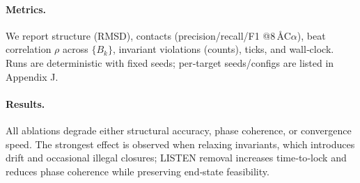\documentclass[12pt,a4paper]{article}
\begin{document}
\paragraph{Metrics.}
We report structure (RMSD), contacts (precision/recall/F1 @8\,\AA C$\alpha$), beat correlation $\rho$ across $\{B_k\}$, invariant violations (counts), ticks, and wall‑clock. Runs are deterministic with fixed seeds; per‑target seeds/configs are listed in Appendix J.
\paragraph{Results.}
All ablations degrade either structural accuracy, phase coherence, or convergence speed. The strongest effect is observed when relaxing invariants, which introduces drift and occasional illegal closures; LISTEN removal increases time‑to‑lock and reduces phase coherence while preserving end‑state feasibility.
\end{document}
